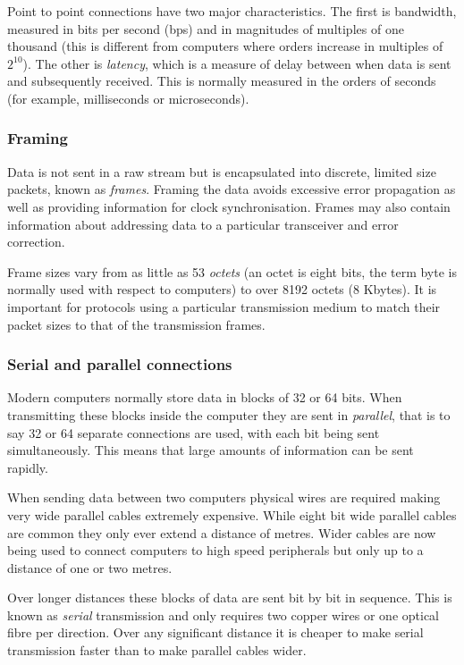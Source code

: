 Point to point connections have two major characteristics.  The first is
bandwidth, measured in bits per second (bps) and in magnitudes of
multiples of one thousand (this is different from computers where
orders increase in multiples of $2^{10}$).  The other is {\em
latency}, which is a measure of delay between when data is sent and
subsequently received.  This is normally measured in the orders of
seconds (for example, milliseconds or microseconds).

\subsubsection{Framing}

Data is not sent in a raw stream but is encapsulated into discrete,
limited size packets, known as {\em frames}.  Framing the data avoids
excessive error propagation as well as providing information for
clock synchronisation.  Frames may also contain information about
addressing data to a particular transceiver and error correction.

Frame sizes vary from as little as 53 {\em octets} (an octet is eight
bits,  the term byte is normally used with respect to computers) to
over 8192 octets (8 Kbytes).  It is important for protocols using a
particular transmission medium to match their packet sizes to that of
the transmission frames.

\subsubsection{Serial and parallel connections}

Modern computers normally store data in blocks of 32 or 64 bits.  When
transmitting these blocks inside the computer they are sent in {\em
parallel}, that is to say 32 or 64 separate connections are used, with
each bit being sent simultaneously.  This means that large amounts of
information can be sent rapidly.

When sending data between two computers physical wires are required
making very wide parallel cables extremely expensive.  While eight bit
wide parallel cables are common they only ever extend a distance of
metres.  Wider cables are now being used to connect computers to high
speed peripherals but only up to a distance of one or two metres.

Over longer distances these blocks of data are sent bit by bit in
sequence.  This is known as {\em serial} transmission and only
requires two copper wires or one optical fibre per direction.  Over
any significant distance it is cheaper to make serial transmission
faster than to make parallel cables wider.

